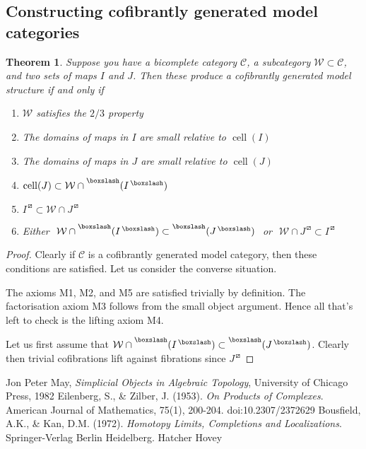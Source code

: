 \documentclass{amsart}
\DeclareMathOperator{\cell}{cell}
\newtheorem{theorem}{Theorem}[subsection]
\theoremstyle{definition}
\begin{document}
  \subsection{Constructing cofibrantly generated model categories}
  \begin{theorem}
    Suppose you have a bicomplete category $\mathcal{C}$, a subcategory
    $\mathcal{W}\subset \mathcal{C}$, and two sets of maps
    $I$ and $J$. Then these produce a cofibrantly generated model
    structure if and only if
    \begin{enumerate}
    \item $\mathcal{W}$ satisfies the $2/3$ property
    \item The domains of maps in $I$ are small relative to $\cell(I)$
    \item The domains of maps in $J$ are small relative to $\cell(J)$
    \item $\cell(J)\subset \mathcal{W}\cap \prescript{\boxslash}{}{
        (I^{\,\boxslash})}$
    \item $I^{\,\boxslash}\subset \mathcal{W}\cap J^{\,\boxslash}$
    \item Either \,\,$\mathcal{W}\cap \prescript{\boxslash}{}{
        (I^{\,\boxslash})} \subset \prescript{\boxslash}{}{
        (J^{\,\boxslash})}$ \,\,or\,\, 
      $\mathcal{W}\cap J^{\,\boxslash}\subset I^{\,\boxslash}$
    \end{enumerate}
  \end{theorem}
  \begin{proof}
    Clearly if $\mathcal{C}$ is a cofibrantly generated model
    category, then these conditions are satisfied.
    Let us consider the converse situation.

    The axioms M1, M2, and M5 are satisfied trivially by definition.
    The factorisation axiom M3 follows from the small object argument.
    Hence all that's left to check is the lifting axiom M4.

    Let us first assume that 
    $\mathcal{W}\cap \prescript{\boxslash}{}{
        (I^{\,\boxslash})} \subset \prescript{\boxslash}{}{
        (J^{\,\boxslash})}$. Clearly then trivial cofibrations
      lift against fibrations since $J^{\,\boxslash}$ 
  \end{proof}

\begin{thebibliography}{10}
 Jon Peter May, {\it Simplicial Objects in Algebraic Topology}, University of Chicago Press, 1982
 Eilenberg, S., \& Zilber, J. (1953). {\it On Products of Complexes}. American Journal of Mathematics, 75(1), 200-204. doi:10.2307/2372629
 Bousfield, A.K., \& Kan, D.M. (1972). {\it Homotopy Limits, Completions and Localizations}. Springer-Verlag Berlin Heidelberg.
 Hatcher
 Hovey
\end{thebibliography} 




\end{document}
